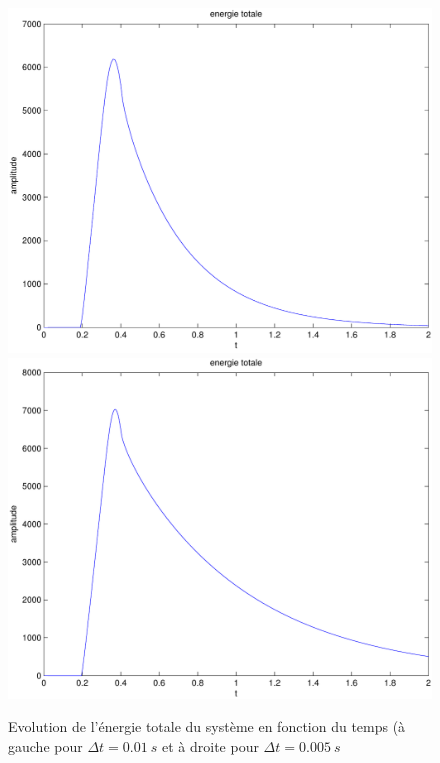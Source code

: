 \documentclass[]{article}
\begin{document}
\begin{figure}
\begin{center}
 \includegraphics[scale=0.4]{Figures/fig3_mod.pdf}
\includegraphics[scale=0.4]{Figures/fig3_mod2.pdf}
\caption{Evolution de l'énergie totale du système en fonction du temps (à
gauche pour $\Delta t=0.01\ s$ et à droite pour $\Delta t=0.005\ s$}
\end{center}
\label{enerimp}
\end{figure}
\end{document}
